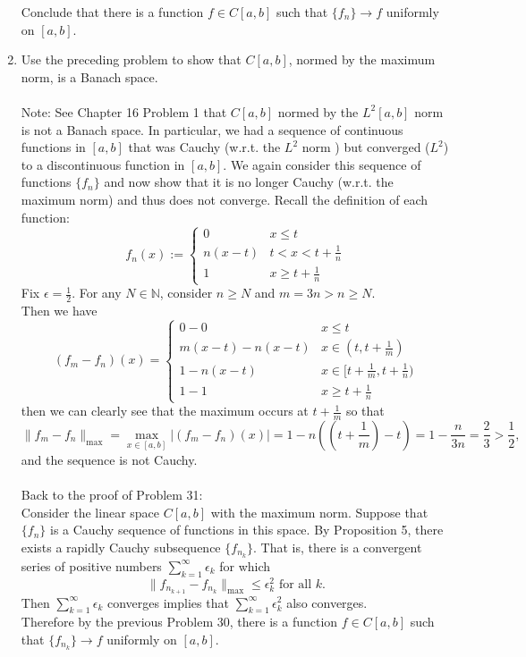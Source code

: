 \begin{enumerate}
\[	\]
	Conclude that there is a function $f\in C[a,b]$ such that $\{f_n\}\to f$ uniformly on $[a,b]$.
	\item Use the preceding problem to show that $C[a,b]$, normed by the maximum norm, is a Banach space.\\
	\\Note: See Chapter 16 Problem 1 that $C[a,b]$ normed by the $L^2[a,b]$ norm is not a Banach space.
	In particular, we had a sequence of continuous functions in $[a,b]$ that was Cauchy (w.r.t. the $L^2$ norm ) but converged ($L^2$) to a discontinuous function in $[a,b]$.
	We again consider this sequence of functions $\{f_n\}$ and now show that it is no longer Cauchy (w.r.t. the maximum norm) and thus does not converge.
	Recall the definition of each function:
	\[
        f_n(x):=
        \begin{cases}
            0 &x\le t\\
            n(x-t)&t<x<t+\frac{1}{n}\\
            1 &x\ge t+\frac{1}{n}
        \end{cases}
    \]
	Fix $\epsilon=\frac{1}{2}$.
	For any $N\in\mathbb{N}$, consider $n\ge N$ and $m=3n>n\ge N$. 
	\\Then we have
	\[
        (f_m-f_n)(x)=
        \begin{cases}
            0-0 &x\le t\\
            m(x-t)-n(x-t)&x\in(t,t+\frac{1}{m})\\
            1-n(x-t)&x\in[t+\frac{1}{m},t+\frac{1}{n})\\
            1-1 &x\ge t+\frac{1}{n}
        \end{cases}
	\]
	then we can clearly see that the maximum occurs at $t+\frac{1}{m}$ so that 
	\[
		\|f_m-f_n\|_{\max}=\max_{x\in[a,b]}|(f_m-f_n)(x)|=1-n((t+\frac{1}{m})-t)=1-\frac{n}{3n}=\frac{2}{3}>\frac{1}{2},
	\]
	and the sequence is not Cauchy.\\
	\\Back to the proof of Problem 31:
	\\Consider the linear space $C[a,b]$ with the maximum norm. 
	Suppose that $\{f_n\}$ is a Cauchy sequence of functions in this space.
	By Proposition 5, there exists a rapidly Cauchy subsequence $\{f_{n_k}\}$.
	That is, there is a convergent series of positive numbers $\sum_{k=1}^\infty\epsilon_k$ for which
	\[
		\|f_{n_{k+1}}-f_{n_k}\|_{\max}\le\epsilon_k^2\text{ for all }k.
	\]
	Then $\sum_{k=1}^\infty\epsilon_k$ converges implies that $\sum_{k=1}^\infty\epsilon_k^2$ also converges.
	\\Therefore by the previous Problem 30, there is a function $f\in C[a,b]$ such that $\{f_{n_k}\}\to f$ uniformly on $[a,b]$.

\end{enumerate}
